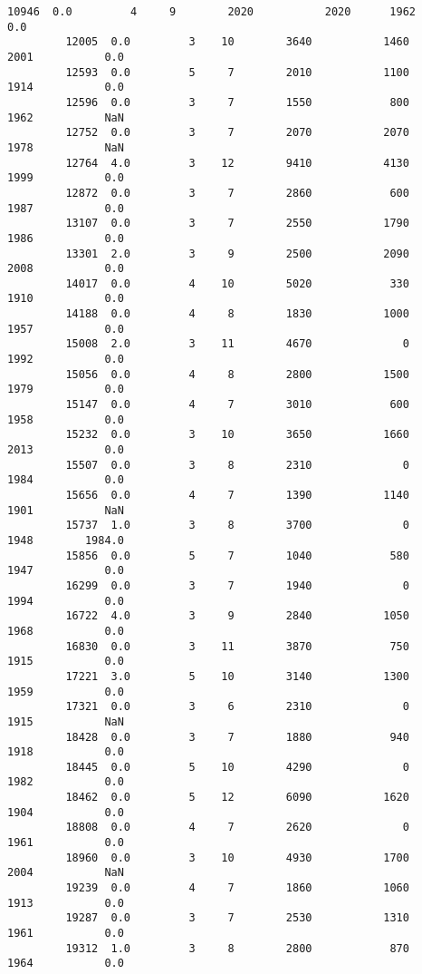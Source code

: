\documentclass[11pt]{article}
\begin{document}
\begin{Verbatim}[commandchars=\\\{\}]
         10946  0.0         4     9        2020           2020      1962           0.0   
         12005  0.0         3    10        3640           1460      2001           0.0   
         12593  0.0         5     7        2010           1100      1914           0.0   
         12596  0.0         3     7        1550            800      1962           NaN   
         12752  0.0         3     7        2070           2070      1978           NaN   
         12764  4.0         3    12        9410           4130      1999           0.0   
         12872  0.0         3     7        2860            600      1987           0.0   
         13107  0.0         3     7        2550           1790      1986           0.0   
         13301  2.0         3     9        2500           2090      2008           0.0   
         14017  0.0         4    10        5020            330      1910           0.0   
         14188  0.0         4     8        1830           1000      1957           0.0   
         15008  2.0         3    11        4670              0      1992           0.0   
         15056  0.0         4     8        2800           1500      1979           0.0   
         15147  0.0         4     7        3010            600      1958           0.0   
         15232  0.0         3    10        3650           1660      2013           0.0   
         15507  0.0         3     8        2310              0      1984           0.0   
         15656  0.0         4     7        1390           1140      1901           NaN   
         15737  1.0         3     8        3700              0      1948        1984.0   
         15856  0.0         5     7        1040            580      1947           0.0   
         16299  0.0         3     7        1940              0      1994           0.0   
         16722  4.0         3     9        2840           1050      1968           0.0   
         16830  0.0         3    11        3870            750      1915           0.0   
         17221  3.0         5    10        3140           1300      1959           0.0   
         17321  0.0         3     6        2310              0      1915           NaN   
         18428  0.0         3     7        1880            940      1918           0.0   
         18445  0.0         5    10        4290              0      1982           0.0   
         18462  0.0         5    12        6090           1620      1904           0.0   
         18808  0.0         4     7        2620              0      1961           0.0   
         18960  0.0         3    10        4930           1700      2004           NaN   
         19239  0.0         4     7        1860           1060      1913           0.0   
         19287  0.0         3     7        2530           1310      1961           0.0   
         19312  1.0         3     8        2800            870      1964           0.0   
         

\end{Verbatim}
\end{document}
